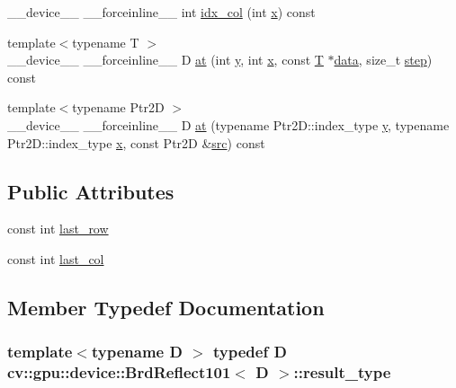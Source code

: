 \begin{DoxyCompactItemize}
\item 
\-\_\-\-\_\-device\-\_\-\-\_\- \-\_\-\-\_\-forceinline\-\_\-\-\_\- int \hyperlink{structcv_1_1gpu_1_1device_1_1BrdReflect101_ac005888ec6d3744a5f8b7d7d6566389c}{idx\-\_\-col} (int \hyperlink{highgui__c_8h_a6150e0515f7202e2fb518f7206ed97dc}{x}) const 
\item 
{\footnotesize template$<$typename T $>$ }\\\-\_\-\-\_\-device\-\_\-\-\_\- \-\_\-\-\_\-forceinline\-\_\-\-\_\- D \hyperlink{structcv_1_1gpu_1_1device_1_1BrdReflect101_a83ae51106002c2b7f8aa2cc2c905764a}{at} (int \hyperlink{highgui__c_8h_af1202c02b14870c18fb3a1da73e9e7c7}{y}, int \hyperlink{highgui__c_8h_a6150e0515f7202e2fb518f7206ed97dc}{x}, const \hyperlink{calib3d_8hpp_a3efb9551a871ddd0463079a808916717}{T} $\ast$\hyperlink{legacy_8hpp_ab9fe6c09e6d02865a953fffc12fe6ca0}{data}, size\-\_\-t \hyperlink{legacy_8hpp_abc16e65f240ed0c8f3e876e8732c0a33}{step}) const 
\item 
{\footnotesize template$<$typename Ptr2\-D $>$ }\\\-\_\-\-\_\-device\-\_\-\-\_\- \-\_\-\-\_\-forceinline\-\_\-\-\_\- D \hyperlink{structcv_1_1gpu_1_1device_1_1BrdReflect101_a9416a54a669a86313569e838faf9f3ee}{at} (typename Ptr2\-D\-::index\-\_\-type \hyperlink{highgui__c_8h_af1202c02b14870c18fb3a1da73e9e7c7}{y}, typename Ptr2\-D\-::index\-\_\-type \hyperlink{highgui__c_8h_a6150e0515f7202e2fb518f7206ed97dc}{x}, const Ptr2\-D \&\hyperlink{legacy_8hpp_a371cd109b74033bc4366f584edd3dacc}{src}) const 
\end{DoxyCompactItemize}
\subsection*{Public Attributes}
\begin{DoxyCompactItemize}
\item 
const int \hyperlink{structcv_1_1gpu_1_1device_1_1BrdReflect101_a84c09f5cd2cdefae21bbde8e0dec32ec}{last\-\_\-row}
\item 
const int \hyperlink{structcv_1_1gpu_1_1device_1_1BrdReflect101_abbb6905ce1697878e411d7ede5d4c5e9}{last\-\_\-col}
\end{DoxyCompactItemize}


\subsection{Member Typedef Documentation}
\hypertarget{structcv_1_1gpu_1_1device_1_1BrdReflect101_a243eb00a5855f0a100f67fd427e1b192}{
\subsubsection[{result\-\_\-type}]{\setlength{\rightskip}{0pt plus 5cm}template$<$typename D $>$ typedef D {\bf cv\-::gpu\-::device\-::\-Brd\-Reflect101}$<$ D $>$\-::{\bf result\-\_\-type}}}\label{structcv_1_1gpu_1_1device_1_1BrdReflect101_a243eb00a5855f0a100f67fd427e1b192}



